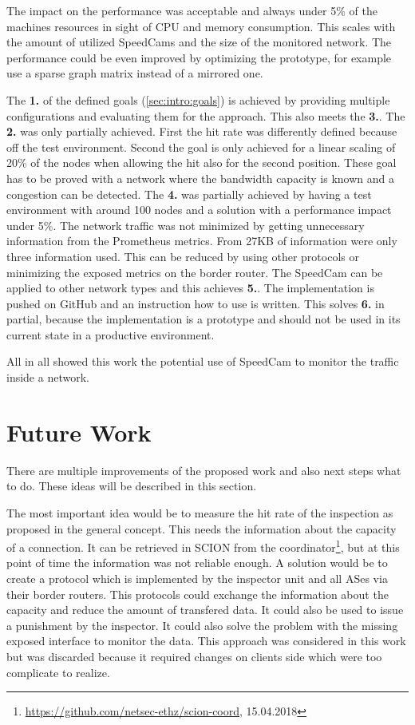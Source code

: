 \documentclass[thesis.tex]{subfiles}
\begin{document}
The impact on the performance was acceptable and always under 5\% of the machines resources in sight of CPU and memory consumption. This scales with the amount of utilized SpeedCams and the size of the monitored network. The performance could be even improved by optimizing the prototype, for example use a sparse graph matrix instead of a mirrored one. 

The \textbf{1.} of the defined goals (\autoref{sec:intro:goals}) is achieved by providing multiple configurations and evaluating them for the approach. This also meets the \textbf{3.}. The \textbf{2.} was only partially achieved. First the hit rate was differently defined because off the test environment. Second the goal is only achieved for a linear scaling of 20\% of the nodes when allowing the hit also for the second position. These goal has to be proved with a network where the bandwidth capacity is known and a congestion can be detected. The \textbf{4.} was partially achieved by having a test environment with around 100 nodes and a solution with a performance impact under 5\%. The network traffic was not minimized by getting unnecessary information from the Prometheus metrics. From 27KB of information were only three information used. This can be reduced by using other protocols or minimizing the exposed metrics on the border router. The SpeedCam can be applied to other network types and this achieves \textbf{5.}. The implementation is pushed on GitHub and an instruction how to use is written. This solves \textbf{6.} in partial, because the implementation is a prototype and should not be used in its current state in a productive environment. 

All in all showed this work the potential use of SpeedCam to monitor the traffic inside a network.

\section{Future Work}
There are multiple improvements of the proposed work and also next steps what to do. These ideas will be described in this section.

The most important idea would be to measure the hit rate of the inspection as proposed in the general concept. This needs the information about the capacity of a connection. It can be retrieved in SCION from the coordinator\footnote{\url{https://github.com/netsec-ethz/scion-coord}, 15.04.2018}, but at this point of time the information was not reliable enough. A solution would be to create a protocol which is implemented by the inspector unit and all ASes via their border routers. This protocols could exchange the information about the capacity and reduce the amount of transfered data. It could also be used to issue a punishment by the inspector. It could also solve the problem with the missing exposed interface to monitor the data. This approach was considered in this work but was discarded because it required changes on clients side which were too complicate to realize.
\end{document}
